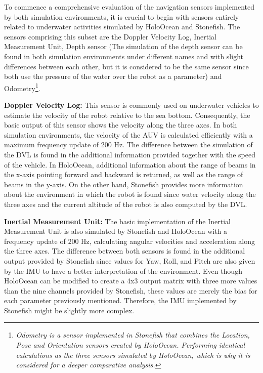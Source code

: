 \documentclass[]{article}
\begin{document}
	To commence a comprehensive evaluation of the navigation sensors implemented by both simulation environments, it is crucial to begin with sensors entirely related to underwater activities simulated by HoloOcean and Stonefish. The sensors comprising this subset are the Doppler Velocity Log, Inertial Measurement Unit, Depth sensor (The simulation of the depth sensor can be found in both simulation environments under different names and with slight differences between each other, but it is considered to be the same sensor since both use the pressure of the water over the robot as a parameter) and Odometry\footnote[9]{\textit{Odometry is a sensor implemented in Stonefish that combines the Location, Pose and Orientation sensors created by HoloOcean. Performing identical calculations as the three sensors simulated by HoloOcean, which is why it is considered for a deeper comparative analysis.}}.
	
	\textbf{Doppler Velocity Log:} This sensor is commonly used on underwater vehicles to estimate the velocity of the robot relative to the sea bottom. Consequently, the basic output of this sensor shows the velocity along the three axes. In both simulation environments, the velocity of the AUV is calculated efficiently with a maximum frequency update of 200 Hz. The difference between the simulation of the DVL is found in the additional information provided together with the speed of the vehicle. In HoloOcean, additional information about the range of beams in the x-axis pointing forward and backward is returned, as well as the range of beams in the y-axis. On the other hand, Stonefish provides more information about the environment in which the robot is found since water velocity along the three axes and the current altitude of the robot is also computed by the DVL.
	
	\textbf{Inertial Measurement Unit:} The basic implementation of the Inertial Measurement Unit is also simulated by Stonefish and HoloOcean with a frequency update of 200 Hz, calculating angular velocities and acceleration along the three axes. The difference between both sensors is found in the additional output provided by Stonefish since values for Yaw, Roll, and Pitch are also given by the IMU to have a better interpretation of the environment. Even though HoloOcean can be modified to create a 4x3 output matrix with three more values than the nine channels provided by Stonefish, these values are merely the bias for each parameter previously mentioned. Therefore, the IMU implemented by Stonefish might be slightly more complex.
	
\end{document}
